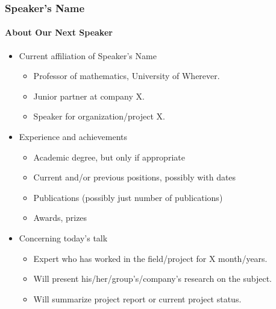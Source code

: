 \documentclass{beamer}
\begin{document}
\begin{frame}
  \frametitle{Speaker's Name}
  \framesubtitle{About Our Next Speaker}

  \begin{itemize}
  \item
    Current affiliation of Speaker's Name

    \begin{itemize}
    \item
      Professor of mathematics, University of Wherever.
    \item
      Junior partner at company X.
    \item
      Speaker for organization/project X.
    \end{itemize}
  \item
    Experience and achievements

    \begin{itemize}
    \item
      Academic degree, but only if appropriate
    \item
      Current and/or previous positions, possibly with dates
    \item
      Publications (possibly just number of publications)
    \item
      Awards, prizes
    \end{itemize}
  \item
    Concerning today's talk

    \begin{itemize}
    \item
      Expert who has worked in the field/project for X month/years.
    \item
      Will present his/her/group's/company's research on the subject.
    \item
      Will summarize project report or current project status.
    \end{itemize}
  \end{itemize}  
\end{frame}
\end{document}
